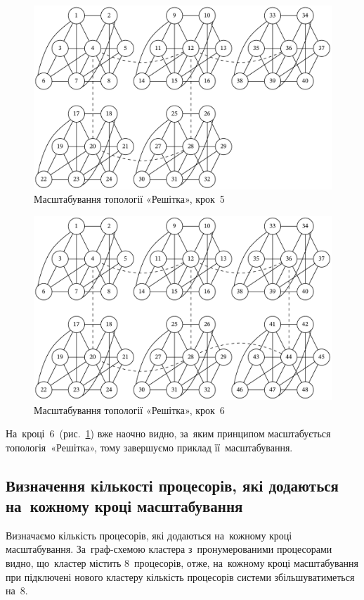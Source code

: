 \documentclass[
	a4paper,
	oneside,
	BCOR = 10mm,
	DIV = 12,
	12pt,
	headings = normal,
]{scrartcl}
\begin{document}
				\begin{figure}[!htbp]
					\centering
					\includegraphics[height=12\baselineskip]{./assets/cluster-08-05-grid-s05.pdf}
					\caption{Масштабування топології «Решітка», крок~5}
					\label{fig:cluster-08-05-grid-s05}
				\end{figure}

				\begin{figure}[!htbp]
					\centering
					\includegraphics[height=12\baselineskip]{./assets/cluster-08-05-grid-s06.pdf}
					\caption{Масштабування топології «Решітка», крок~6}
					\label{fig:cluster-08-05-grid-s06}
				\end{figure}

				На~кроці~6~(рис.~\ref{fig:cluster-08-05-grid-s05}) вже наочно видно, за~яким принципом масштабується топологія~«Решітка», тому завершуємо приклад її~масштабування.

		\subsection{Визначення кількості процесорів, які додаються на~кожному кроці масштабування}
			Визначаємо кількість процесорів, які додаються на~кожному кроці масштабування. За~граф-схемою кластера з~пронумерованими процесорами видно, що~кластер містить 8~процесорів, отже, на~кожному кроці масштабування при підключені нового кластеру кількість процесорів системи збільшуватиметься на~8.
\end{document}
